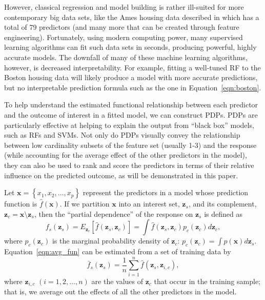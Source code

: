 \documentclass[12pt]{article}
\begin{document}
However, classical regression and model building is rather ill-suited for more contemporary big data sets, like the Ames housing data described in \citet{ames-cock-2011} which has a total of 79 predictors (and many more that can be created through feature engineering). Fortunately, using modern computing power, many supervised learning algorithms can fit such data sets in seconds, producing powerful, highly accurate models. The downfall of many of these machine learning algorithms, however, is decreased interpretability. For example, fitting a well-tuned RF to the Boston housing data will likely produce a model with more accurate predictions, but no interpretable prediction formula such as the one in Equation~\eqref{eqn:boston}.

To help understand the estimated functional relationship between each predictor and the outcome of interest in a fitted model, we can construct PDPs. PDPs are particularly effective at helping to explain the output from ``black box'' models, such as RFs and SVMs. Not only do PDPs visually convey the relationship between low cardinality subsets of the feature set (usually 1-3) and the response (while accounting for the average effect of the other predictors in the model), they can also be used to rank and score the predictors in terms of their relative influence on the predicted outcome, as will be demonstrated in this paper. 

Let $\boldsymbol{x} = \left\{x_1, x_2, \dots, x_p\right\}$ represent the predictors in a model whose prediction function is $\widehat{f}\left(\boldsymbol{x}\right)$. If we partition $\boldsymbol{x}$ into an interest set, $\boldsymbol{z}_s$, and its complement, $\boldsymbol{z}_c = \boldsymbol{x} \setminus \boldsymbol{z}_s$, then the ``partial dependence'' of the response on $\boldsymbol{z}_s$ is defined as
\begin{equation}
\label{eqn:avg_fun}
  f_s\left(\boldsymbol{z}_s\right) = E_{\boldsymbol{z}_c}\left[\widehat{f}\left(\boldsymbol{z}_s, \boldsymbol{z}_c\right)\right] = \int \widehat{f}\left(\boldsymbol{z}_s, \boldsymbol{z}_c\right)p_{c}\left(\boldsymbol{z}_c\right)d\boldsymbol{z}_c,
\end{equation}
where $p_{c}\left(\boldsymbol{z}_c\right)$ is the marginal probability density of $\boldsymbol{z}_c$: $p_{c}\left(\boldsymbol{z}_c\right) = \int p\left(\boldsymbol{x}\right)d\boldsymbol{z}_s$.
Equation~\eqref{eqn:avg_fun} can be estimated from a set of training data by
\begin{equation}
\label{eqn:pdf}
\bar{f}_s\left(\boldsymbol{z}_s\right) = \frac{1}{n}\sum_{i = 1}^n\widehat{f}\left(\boldsymbol{z}_s,\boldsymbol{z}_{i, c}\right),
\end{equation}
where $\boldsymbol{z}_{i, c}$ $\left(i = 1, 2, \dots, n\right)$ are the values of $\boldsymbol{z}_c$ that occur in the training sample; that is, we average out the effects of all the other predictors in the model.
\end{document}
